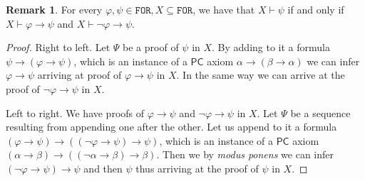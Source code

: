 \documentclass{article}
\theoremstyle{definition}
\theoremstyle{definition}
\theoremstyle{definition}
\newtheorem{remark}{Remark}[section]
\newcommand*{\ra}{\rightarrow}
\newcommand*{\FOR}{\texttt{FOR}}
\newcommand{\PC}{$\mathsf{PC}$\xspace}
\begin{document}
\begin{remark}
    \label{phi_not_phi_ra_psi}
    For every $\varphi, \psi \in \FOR, X \subseteq \FOR$, we have that $X \vdash \psi$ if and only if $X \vdash \varphi \ra \psi$ and $X \vdash \lnot \varphi \ra \psi$.

    \begin{proof}
        Right to left. Let $\Psi$ be a proof of $\psi$ in $X$. By adding to it a formula $\psi \ra (\varphi \ra \psi)$, which is an instance of a \PC axiom $\alpha \ra (\beta \ra \alpha)$ we can infer $\varphi \ra \psi$ arriving at proof of $\varphi \ra \psi$ in $X$. In the same way we can arrive at the proof of $\lnot \varphi \ra \psi$ in $X$.

        Left to right. We have proofs of $\varphi \ra \psi$ and $\lnot \varphi \ra
            \psi$ in $X$. Let $\Psi$ be a sequence resulting from appending one after the
        other. Let us append to it a formula $(\varphi \ra \psi) \ra ((\lnot \varphi
            \ra \psi) \ra \psi)$, which is an instance of a \PC axiom $(\alpha \ra \beta)
            \ra ((\lnot \alpha \ra \beta) \ra \beta)$. Then we by \emph{modus ponens} we
        can infer $(\lnot \varphi \ra \psi) \ra \psi$ and then $\psi$ thus arriving at
        the proof of $\psi$ in $X$.
    \end{proof}
\end{remark}
\end{document}
